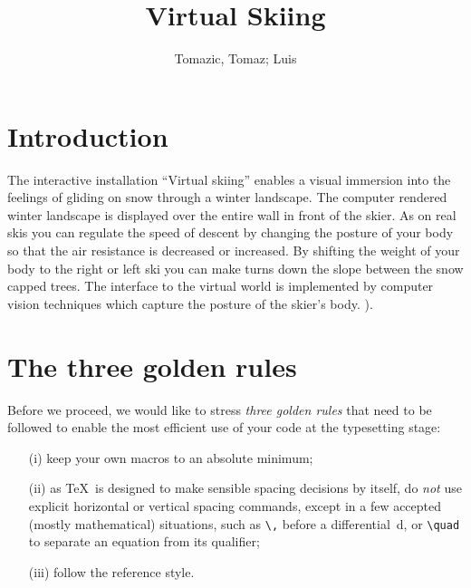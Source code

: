 \documentclass[fonts]{icst}
\begin{document}

\title{Virtual Skiing}

\author{Tomazic, Tomaz; Luis}

\address{University of Ljubljana, Faculty of informatics and computer science}



\tnotetext[1]{Please ensure that you use the most up to date
class file,
available from XXXXX at \dots
}


\maketitle

\section{Introduction}
The interactive installation “Virtual skiing” enables a visual immersion into the feelings of gliding on snow through a winter landscape. The computer rendered winter landscape is displayed over the entire wall in front of the skier. As on real skis you can regulate the speed of descent by changing the posture of your body so that the air resistance is decreased or increased. By shifting the weight of your body to the right or left ski you can make turns down the slope between the snow capped trees. The interface to the virtual world is implemented by computer vision techniques which capture the posture of the skier’s body. \cite{ORIG}).

\section{The three golden rules}
Before we proceed, we would like to stress \emph{three golden
rules} that need to be followed to enable the most efficient use
of your code at the typesetting stage:
\begin{enumerate}
\item[(i)] keep your own macros to an absolute minimum;

\item[(ii)] as \TeX\ is designed to make sensible spacing
decisions by itself, do \emph{not} use explicit horizontal or
vertical spacing commands, except in a few accepted (mostly
mathematical) situations, such as \verb"\," before a
differential~d, or \verb"\quad" to separate an equation from its
qualifier;

\item[(iii)] follow the \emph{\journalnamelc} reference style.
\end{enumerate}
\end{document}
